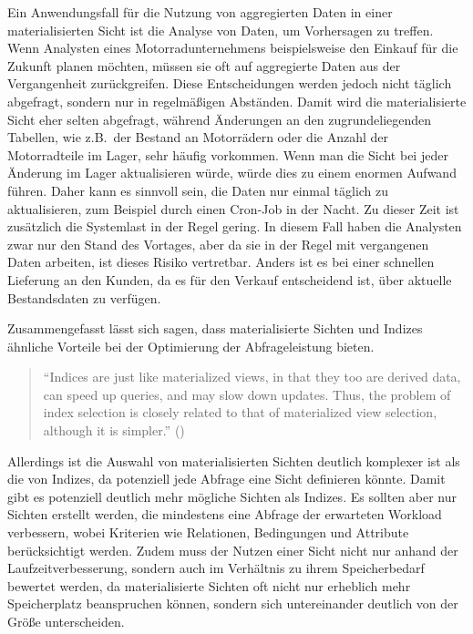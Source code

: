 Ein Anwendungsfall für die Nutzung von aggregierten Daten in einer materialisierten Sicht ist die Analyse von Daten, um Vorhersagen zu treffen.
Wenn Analysten eines Motorradunternehmens beispielsweise den Einkauf für die Zukunft planen möchten, müssen sie oft auf aggregierte Daten aus der Vergangenheit zurückgreifen.
Diese Entscheidungen werden jedoch nicht täglich abgefragt, sondern nur in regelmäßigen Abständen.
Damit wird die materialisierte Sicht eher selten abgefragt, während Änderungen an den zugrundeliegenden Tabellen, wie z.B.\ der Bestand an Motorrädern oder die Anzahl der Motorradteile im Lager, sehr häufig vorkommen.
Wenn man die Sicht bei jeder Änderung im Lager aktualisieren würde, würde dies zu einem enormen Aufwand führen.
Daher kann es sinnvoll sein, die Daten nur einmal täglich zu aktualisieren, zum Beispiel durch einen Cron-Job in der Nacht.
Zu dieser Zeit ist zusätzlich die Systemlast in der Regel gering.
In diesem Fall haben die Analysten zwar nur den Stand des Vortages, aber da sie in der Regel mit vergangenen Daten arbeiten, ist dieses Risiko vertretbar.
Anders ist es bei einer schnellen Lieferung an den Kunden, da es für den Verkauf entscheidend ist, über aktuelle Bestandsdaten zu verfügen.

Zusammengefasst lässt sich sagen, dass materialisierte Sichten und Indizes ähnliche Vorteile bei der Optimierung der Abfrageleistung bieten.

\begin{quote}
    \enquote{Indices are just like materialized views, in that they too are derived data, can speed up queries, and may slow down updates. Thus, the problem of index selection is closely related to that of materialized view selection, although it is simpler.} (\cite[S. 613]{silberschatz2011database})
\end{quote}

Allerdings ist die Auswahl von materialisierten Sichten deutlich komplexer ist als die von Indizes, da potenziell jede Abfrage eine Sicht definieren könnte.
Damit gibt es potenziell deutlich mehr mögliche Sichten als Indizes.
Es sollten aber nur Sichten erstellt werden, die mindestens eine Abfrage der erwarteten Workload verbessern, wobei Kriterien wie Relationen, Bedingungen und Attribute berücksichtigt werden.
Zudem muss der Nutzen einer Sicht nicht nur anhand der Laufzeitverbesserung, sondern auch im Verhältnis zu ihrem Speicherbedarf bewertet werden, da materialisierte Sichten oft nicht nur erheblich mehr Speicherplatz beanspruchen können, sondern sich untereinander deutlich von der Größe unterscheiden.

